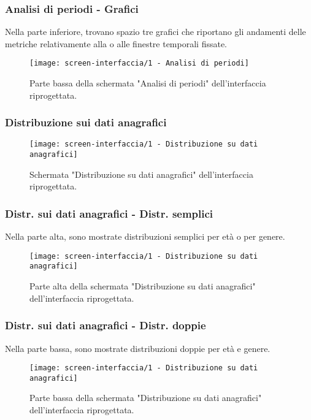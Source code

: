\begin{frame}
    \frametitle{Analisi di periodi - Grafici}
    Nella parte inferiore, trovano spazio tre grafici che riportano gli andamenti delle metriche relativamente alla o alle finestre temporali fissate.
    \vspace{20pt}
    \begin{figure}
        \centering
        \texttt{[image: screen-interfaccia/1 - Analisi di periodi]}
        \caption{Parte bassa della schermata "Analisi di periodi" dell'interfaccia riprogettata.}
    \end{figure}    

\end{frame}

\begin{frame}
    \frametitle{Distribuzione sui dati anagrafici}
    \label{distribuzione}
    \begin{figure}
        \centering
        \texttt{[image: screen-interfaccia/1 - Distribuzione su dati anagrafici]}
        \caption{Schermata "Distribuzione su dati anagrafici" dell'interfaccia riprogettata.}
    \end{figure}    

\end{frame}

\begin{frame}
    \frametitle{Distr. sui dati anagrafici - Distr. semplici}
    Nella parte alta, sono mostrate distribuzioni semplici per età o per genere.
    \begin{figure}
        \centering
        \vspace{20pt}
        \texttt{[image: screen-interfaccia/1 - Distribuzione su dati anagrafici]}
        \caption{Parte alta della schermata "Distribuzione su dati anagrafici" dell'interfaccia riprogettata.}
    \end{figure}    

\end{frame}

\begin{frame}
    \frametitle{Distr. sui dati anagrafici - Distr. doppie}
    Nella parte bassa, sono mostrate distribuzioni doppie per età e genere.
    \begin{figure}
        \centering        
        \vspace{20pt}
        \texttt{[image: screen-interfaccia/1 - Distribuzione su dati anagrafici]}
        \caption{Parte bassa della schermata "Distribuzione su dati anagrafici" dell'interfaccia riprogettata.}
    \end{figure}    

\end{frame}
